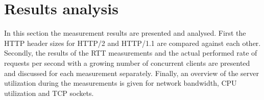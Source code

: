 \section{Results analysis}
\label{sec:results}
In this section the measurement results are presented and analysed. First the HTTP header sizes for HTTP/2 and HTTP/1.1 are compared against each other. Secondly, the results of the RTT measurements and the actual performed rate of requests per second with a growing number of concurrent clients are presented and discussed for each measurement separately. Finally, an overview of the server utilization during the measurements is given for network bandwidth, CPU utilization and TCP sockets.  